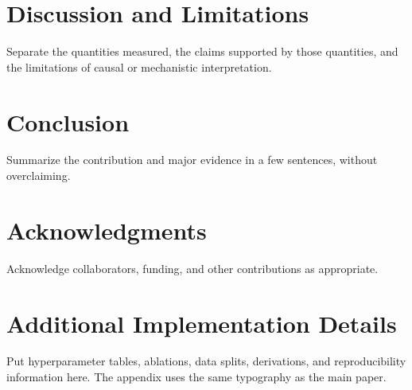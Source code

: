 \documentclass[11pt]{article}
\begin{document}
\section{Discussion and Limitations}
Separate the quantities measured, the claims supported by those quantities, and the limitations of causal or mechanistic interpretation.

\section{Conclusion}
Summarize the contribution and major evidence in a few sentences, without overclaiming.

\section*{Acknowledgments}
Acknowledge collaborators, funding, and other contributions as appropriate.




\appendix
\section{Additional Implementation Details}
Put hyperparameter tables, ablations, data splits, derivations, and reproducibility information here. The appendix uses the same typography as the main paper.
\end{document}
